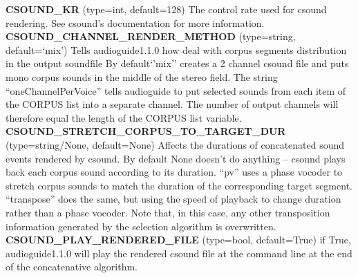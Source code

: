 \documentclass{article}
\newcommand{\optEntry}[4]{\textbf{#1} (type={\color{red}#2}, default={\color{ForestGreen}#3}) #4\hspace{0.5em}\\}
\newcommand{\ag}{audioguide1.1.0\xspace}
\begin{document}
\begin{spacing}{1.2}
\optEntry{CSOUND\_KR}{int}{128}{The control rate used for csound rendering.  See csound's documentation for more information.}

\optEntry{CSOUND\_CHANNEL\_RENDER\_METHOD}{string}{`mix'}{Tells \ag how deal with corpus segments distribution in the output soundfile  By default`'mix'' creates a 2 channel csound file and puts mono corpus sounds in the middle of the stereo field.  The string ``oneChannelPerVoice'' tells audioguide to put selected sounds from each item of the CORPUS list into a separate channel.  The number of output channels will therefore equal the length of the CORPUS list variable.}

\optEntry{CSOUND\_STRETCH\_CORPUS\_TO\_TARGET\_DUR}{string/None}{None}{Affects the durations of concatenated sound events rendered by csound.  By default None doesn't do anything -- csound plays back each corpus sound according to its duration.  ``pv'' uses a phase vocoder to stretch corpus sounds to match the duration of the corresponding target segment.  ``transpose'' does the same, but using the speed of playback to change duration rather than a phase vocoder.  Note that, in this case, any other transposition information generated by the selection algorithm is overwritten.}

\optEntry{CSOUND\_PLAY\_RENDERED\_FILE}{bool}{True}{if True, \ag will play the rendered csound file at the command line at the end of the concatenative algorithm.}



\end{spacing}
\end{document}
